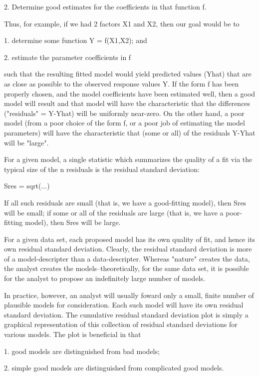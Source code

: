    2. Determine good estimates for the coefficients in
      that function f.

Thus, for example, if we had 2 factors X1 and X2,
then our goal would be to

   1. determine some function Y = f(X1,X2); and

   2. estimate the parameter coefficients in f

such that the resulting fitted model would
yield predicted values (Yhat) that are as close as
possible to the observed response values Y.
If the form f has been properly chosen, and the model
coefficients have been estimated well, then a good
model will result and that model will have the
characteristic that the differences ("residuals" =
Y-Yhat) will be uniformly near-zero.  On the other
hand, a poor model (from a poor choice of the form f,
or a poor job of estimating the model parameters) will
have the characteristic that (some or all) of the
residuals Y-Yhat will be "large".

For a given model, a single statistic which summarizes
the quality of a fit via the typical size of the n
residuals is the residual standard deviation:

      Sres = sqrt(...)

If all such residuals are small (that is, we have
a good-fitting model), then Sres will be small; if
some or all of the residuals are large (that is,
we have a poor-fitting model), then Sres will be
large.

For a given data set, each proposed model has its own
quality of fit, and hence its own residual standard
deviation.  Clearly, the residual standard deviation is
more of a model-descripter than a data-descripter.
Whereas "nature" creates the data, the analyst
creates the models--theoretically, for the same
data set, it is possible for the analyst to
propose an indefinitely large number of models.

In practice, however, an analyst will usually
foward only a small, finite number of plausible
models for consideration.  Each such model will
have its own residual standard deviation.  The
cumulative residual standard deviation plot is
simply a graphical representation of this
collection of residual standard deviations for
various models.  The plot is beneficial in that

   1. good models are distinguished from bad models;

   2. simple good models are distinguished from
      complicated good models.

